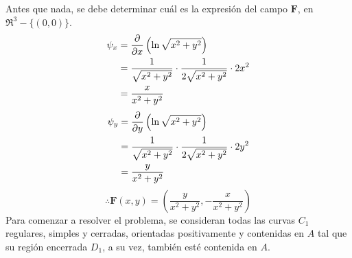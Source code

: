 \newpage
\begin{solution}

    Antes que nada, se debe determinar cuál es la expresión del campo $\boldsymbol{F}$, en $\Re^3-\{(0,0)\}$.
    \begin{align*}
        \psi_x&=\frac{\partial}{\partial x}\left(\ln{\sqrt{x^2+y^2}}\right)\\
        &=\frac{1}{\sqrt{x^2+y^2}} \cdot \frac{1}{2\sqrt{x^2+y^2}} \cdot 2x^2\\
        &=\frac{x}{x^2+y^2}
    \end{align*}
    \begin{align*}
        \psi_y&=\frac{\partial}{\partial y}\left(\ln{\sqrt{x^2+y^2}}\right)\\
        &=\frac{1}{\sqrt{x^2+y^2}} \cdot \frac{1}{2\sqrt{x^2+y^2}} \cdot 2y^2\\
        &=\frac{y}{x^2+y^2}
    \end{align*}
    \begin{equation*}
        \therefore \boldsymbol{F}(x,y)= \left(\frac{y}{x^2+y^2}, -\frac{x}{x^2+y^2}\right)
    \end{equation*}
    Para comenzar a resolver el problema, se consideran todas las curvas $C_1$ regulares, simples y cerradas, orientadas positivamente
    y contenidas en $A$ tal que su región encerrada $D_1$, a su vez, también esté contenida en $A$. 
    \begin{center}
\end{center}
\end{solution}
